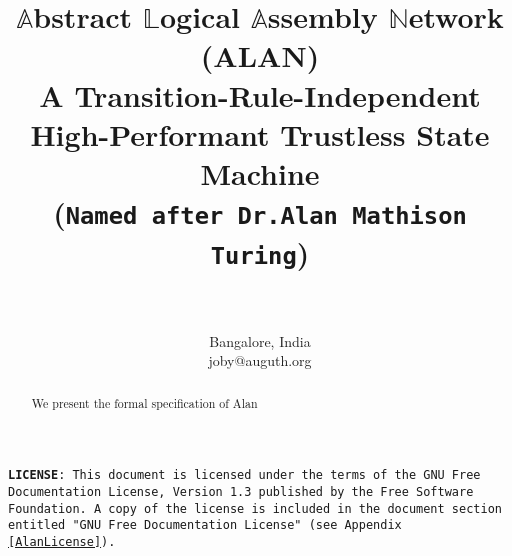 \documentclass[9pt]{IEEEtran} %
\begin{document}
\pagecolor{PaleTurquoise!55}

\title{$\mathbb{A}$bstract $\mathbb{L}$ogical $\mathbb{A}$ssembly $\mathbb{N}$etwork (${\mathbf{ALAN}}$) \\ \vspace{3mm} \Large{A Transition-Rule-Independent High-Performant Trustless State Machine} \vspace{2mm} \\ \scriptsize{(\texttt{Named after Dr.Alan Mathison Turing})} \vspace{0.5mm}}

\author{ \\
 \\
\normalsize{Bangalore, India \\
joby@auguth.org} \vspace{-5mm} \\
}


\maketitle

\normalsize

\begin{center}
\begin{spacing}{0.8}
\begin{justify}
\texttt{\scriptsize{\textbf{LICENSE}: \texttt{This document is licensed under the terms of the GNU Free Documentation License, Version 1.3 published by the Free Software Foundation. A copy of the license is included in the document section entitled "GNU Free Documentation License" (see Appendix \ref{AlanLicense}).}}}
\end{justify}
\end{spacing}
\end{center}

\begin{abstract}

\small{
\vspace{1mm}

We present the formal specification of Alan

}
\end{abstract}



\clearpage
\tableofcontents

\clearpage

\end{document}
